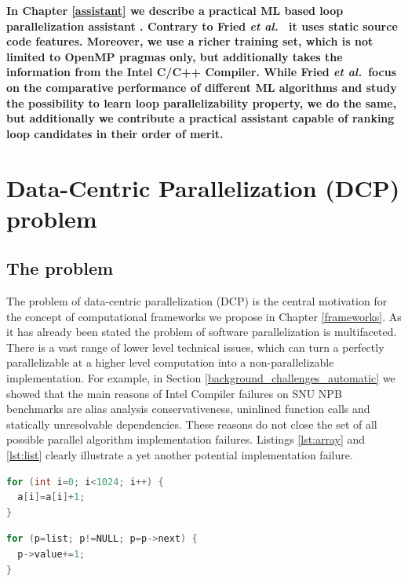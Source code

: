 \textbf{\quad In Chapter \ref{assistant} we describe a practical ML based loop parallelization assistant \cite{assistant-aiseps}. Contrary to Fried \emph{et al.}~\cite{fried_ea:2013:icmla} it uses static source code features. Moreover, we use a richer training set, which is not limited to OpenMP pragmas only, but additionally takes the information from the Intel C/C++ Compiler. While Fried \emph{et al.}~focus on the comparative performance of different ML algorithms and study the possibility to learn loop parallelizability property, we do the same, but additionally we contribute a practical assistant capable of ranking loop candidates in their order of merit.}

\section{Data-Centric Parallelization (DCP) problem}
\label{background_dcp}
\subsection{The problem}
\label{background_dcp_problem}
\quad The problem of data-centric parallelization (DCP) is the central motivation for the concept of computational frameworks we propose in Chapter \ref{frameworks}. As it has already been stated the problem of software parallelization is multifaceted. There is a vast range of lower level technical issues, which can turn a perfectly parallelizable at a higher level computation into a non-parallelizable implementation. For example, in Section \ref{background_challenges_automatic} we showed that the main reasons of Intel Compiler failures on SNU NPB benchmarks are alias analysis conservativeness, uninlined function calls and statically unresolvable dependencies. These reasons do not close the set of all possible parallel algorithm implementation failures. Listings \ref{lst:array} and \ref{lst:list} clearly illustrate a yet another potential implementation failure.\newline\null
\begin{minipage}[t]{0.5\linewidth}
\begin{lstlisting}[caption={\raggedright Parallelisable loop operating on a \textbf{linear array}.},label={lst:array},language=C]
for (int i=0; i<1024; i++) {
  a[i]=a[i]+1;
}
\end{lstlisting}
\end{minipage}
%
\begin{minipage}[t]{0.5\linewidth}
\begin{lstlisting}[caption={\raggedright Non-parallelisable loop operating on a \textbf{linked-list}.},label={lst:list},language=C]
for (p=list; p!=NULL; p=p->next) {
  p->value+=1;
}
\end{lstlisting}
\end{minipage}

